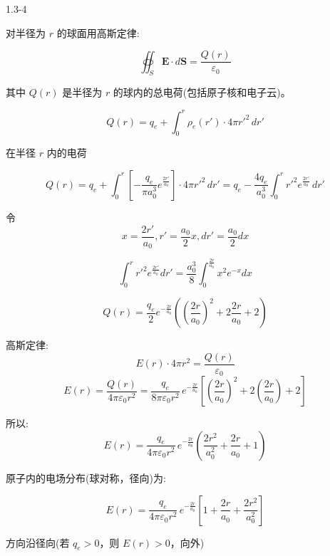 \documentclass{article}
\begin{document}

1.3-4

对半径为 $ r $ 的球面用高斯定律:

$$\oiint_S \mathbf{E} \cdot d\mathbf{S} = \frac{Q(r)}{\varepsilon_0}$$

其中 $ Q(r) $ 是半径为 $ r $ 的球内的总电荷(包括原子核和电子云)。

$$Q(r) = q_e + \int_0^r \rho_e(r') \cdot 4\pi r'^2 \, dr'$$

在半径 $ r $ 内的电荷

$$Q(r) = q_e+\int_0^r \left[ -\frac{q_e}{\pi a_0^3} e^{\frac{2r'}{a_0}} \right] \cdot 4\pi r'^2 \, dr'= q_e-\frac{4q_e}{a_0^3} \int_0^r r'^2 e^{\frac{2r'}{a_0}} \, dr'$$

令
$$ x = \frac{2r'}{a_0} , r' = \frac{a_0}{2} x , dr' = \frac{a_0}{2} dx $$

$$\int_0^r r'^2 e^{\frac{2r'}{a_0}} dr' = \frac{a_0^3}{8} \int_0^{\frac{2r}{a_0}} x^2 e^{-x} dx$$

$$Q(r)= \frac{q_e}{2} e^{-\frac{2r}{a_0}}((\frac{2r}{a_0})^2 + 2\frac{2r}{a_0} + 2)$$

高斯定律:
$$E(r) \cdot 4\pi r^2 = \frac{Q(r)}{\varepsilon_0}$$
$$E(r) = \frac{Q(r)}{4\pi \varepsilon_0 r^2}= \frac{q_e}{8\pi \varepsilon_0 r^2} \, e^{-\frac{2r}{a_0}} \left[ \left( \frac{2r}{a_0} \right)^2 + 2\left( \frac{2r}{a_0} \right) + 2 \right]$$

所以:
$$E(r) = \frac{q_e}{4\pi \varepsilon_0 r^2} \, e^{-\frac{2r}{a_0}} \left( \frac{2r^2}{a_0^2} + \frac{2r}{a_0} + 1 \right)$$

原子内的电场分布(球对称，径向)为:

$$E(r) = \frac{q_e}{4\pi\varepsilon_0 r^2} \, e^{-\frac{2r}{a_0}} \left[ 1 + \frac{2r}{a_0} + \frac{2r^2}{a_0^2} \right]$$

方向沿径向(若 $ q_e > 0 $，则 $ E(r) > 0 $，向外)




\newpage

\end{document}
